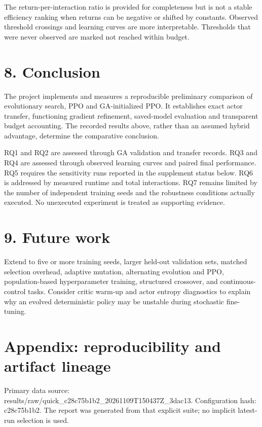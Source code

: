 \documentclass[11pt,a4paper]{article}
\begin{document}
The return-per-interaction ratio is provided for completeness but is not a stable efficiency ranking when returns can be negative or shifted by constants. Observed threshold crossings and learning curves are more interpretable. Thresholds that were never observed are marked not reached within budget.

\section*{8. Conclusion}
The project implements and measures a reproducible preliminary comparison of evolutionary search, PPO and GA-initialized PPO. It establishes exact actor transfer, functioning gradient refinement, saved-model evaluation and transparent budget accounting. The recorded results above, rather than an assumed hybrid advantage, determine the comparative conclusion.

RQ1 and RQ2 are assessed through GA validation and transfer records. RQ3 and RQ4 are assessed through observed learning curves and paired final performance. RQ5 requires the sensitivity runs reported in the supplement status below. RQ6 is addressed by measured runtime and total interactions. RQ7 remains limited by the number of independent training seeds and the robustness conditions actually executed. No unexecuted experiment is treated as supporting evidence.

\section*{9. Future work}
Extend to five or more training seeds, larger held-out validation sets, matched selection overhead, adaptive mutation, alternating evolution and PPO, population-based hyperparameter training, structured crossover, and continuous-control tasks. Consider critic warm-up and actor entropy diagnostics to explain why an evolved deterministic policy may be unstable during stochastic fine-tuning.

\section*{Appendix: reproducibility and artifact lineage}
Primary data source: results/raw/quick\_c28c75b1b2\_20261109T150437Z\_3dac13. Configuration hash: c28c75b1b2. The report was generated from that explicit suite; no implicit latest-run selection is used.
\end{document}
